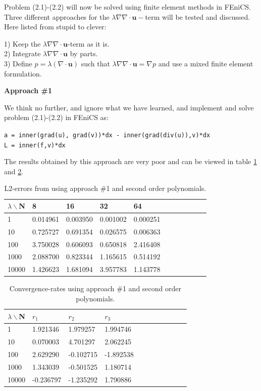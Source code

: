 \documentclass[11pt,a4paper,english]{article}
\numberwithin{equation}{section}
\begin{document}
Problem (2.1)-(2.2) will now be solved using finite element methods in FEniCS. Three different approaches for the $\lambda \nabla \nabla \cdot \mathbf{u}-$term will be tested and discussed. Here listed from stupid to clever:

1) Keep the $\lambda \nabla \nabla \cdot \mathbf{u}$-term as it is. \\
2) Integrate $\lambda \nabla \nabla \cdot \mathbf{u}$ by parts. \\
3) Define $p=\lambda(\nabla \cdot \mathbf{u})$ such that $\lambda \nabla \nabla \cdot \mathbf{u} = \nabla p$ and use a mixed finite element formulation. 

\textbf{Approach \#1}

We think no further, and ignore what we have learned, and implement and solve problem (2.1)-(2.2) in FEniCS as:

\begin{framed}
\texttt{a = inner(grad(u), grad(v))*dx - inner(grad(div(u)),v)*dx \\
L = inner(f,v)*dx}  
\end{framed} 

The results obtained by this approach are very poor and can be viewed in table \ref{tab:err1} and \ref{tab:con1}. 

\begin{table}[H]
\centering
\caption{ L2-errors from using approach \#1 and second order polynomials.}
\vspace{3mm}
\begin{tabular}{|l|l|l|l|l|l|l|l|l|l|l|}
\hline
$\lambda\backslash$N & 8 & 16 & 32 & 64 \\
\hline
1 & 0.014961 & 0.003950 & 0.001002 & 0.000251 \\
\hline
10 & 0.725727 & 0.691354 & 0.026575 & 0.006363 \\
\hline
100 & 3.750028 & 0.606093 & 0.650818 & 2.416408 \\
\hline
1000 & 2.088700 & 0.823344 & 1.165615 & 0.514192 \\
\hline
10000 & 1.426623 & 1.681094 & 3.957783 & 1.143778 \\
\hline
\end{tabular}
\label{tab:err1}
\end{table}

\begin{table}[H]
\centering
\caption{ Convergence-rates using approach \#1 and second order polynomials. }
\vspace{3mm}
\begin{tabular}{|l|l|l|l|l|l|l|l|l|l|l|}
\hline
$\lambda \backslash$N & $r_1$ & $r_2$ & $r_3$ \\
\hline
1 & 1.921346 & 1.979257 & 1.994746 \\
\hline
10 & 0.070003 & 4.701297 & 2.062245 \\
\hline
100 & 2.629290 & -0.102715 & -1.892538 \\
\hline
1000 & 1.343039 & -0.501525 & 1.180714 \\
\hline
10000 & -0.236797 & -1.235292 & 1.790886 \\
\hline
\end{tabular}
\label{tab:con1}
\end{table}
\end{document}
